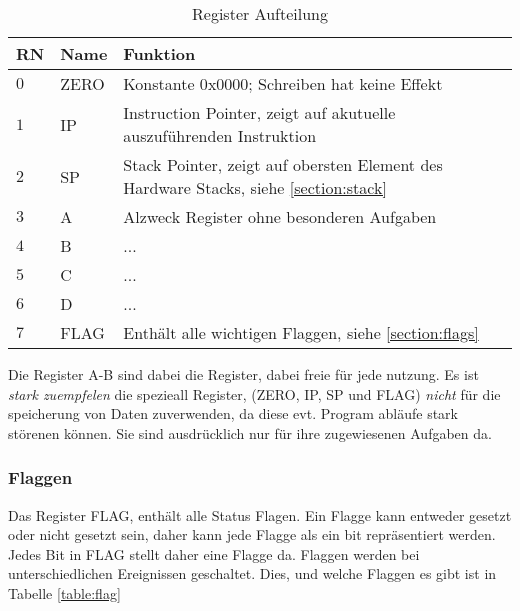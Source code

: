 \documentclass{scrartcl}
\begin{document}
\begin{center}
	\begin{table}[h]
		\caption{\label{table:register} Register Aufteilung}
		\begin{tabular}{l | l | l}
			RN & Name & Funktion\\
			\hline
			$0$ & ZERO & Konstante $0\text{x}0000$; Schreiben hat keine Effekt\\
			$1$ & IP & Instruction Pointer, zeigt auf akutuelle auszuführenden Instruktion\\
			$2$ & SP & Stack Pointer, zeigt auf obersten Element des Hardware Stacks, siehe \ref{section:stack} \\
			$3$ & A & Alzweck Register ohne besonderen Aufgaben \\
			$4$ & B & ... \\
			$5$ & C & ... \\
			$6$ & D & ... \\
			$7$ & FLAG & Enthält alle wichtigen Flaggen, siehe \ref{section:flags} \\
		\end{tabular}
	\end{table}
\end{center}

Die Register A-B sind dabei die Register, dabei freie für jede nutzung. Es ist \emph{stark zuempfelen} die spezieall Register, (ZERO, IP, SP und FLAG) \emph{nicht} für die speicherung von Daten zuverwenden, da diese evt. Program abläufe stark störenen können. Sie sind ausdrücklich nur für ihre zugewiesenen Aufgaben da.

\subsubsection{\label{section:flags}Flaggen}

Das Register FLAG, enthält alle Status Flagen. Ein Flagge kann entweder gesetzt oder nicht gesetzt sein, daher kann jede Flagge als ein bit repräsentiert werden. Jedes Bit in FLAG stellt daher eine Flagge da. Flaggen werden bei unterschiedlichen Ereignissen geschaltet. Dies, und welche Flaggen es gibt ist in Tabelle \ref{table:flag}
\end{document}
